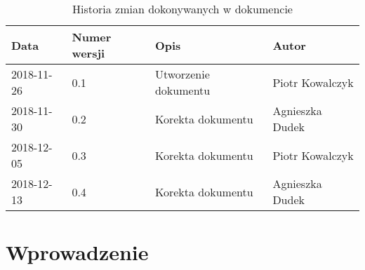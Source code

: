 \documentclass{article}
\begin{document}
\begin{titlepage}






\end{titlepage}

\addtocounter{page}{1}
\newpage

\begin{table}[h!]
	\begin{center}
		\caption{Historia zmian dokonywanych w dokumencie}
		\begin{tabular}{|l|l|l|l|}
			\hline
			Data & Numer wersji & Opis & Autor \\
			\hline \hline
			2018-11-26 & 0.1 & Utworzenie dokumentu & Piotr Kowalczyk \\
			\hline 
			2018-11-30 & 0.2 & Korekta dokumentu & Agnieszka Dudek \\
			\hline
			2018-12-05 & 0.3 & Korekta dokumentu & Piotr Kowalczyk \\
			\hline
			2018-12-13 & 0.4 & Korekta dokumentu & Agnieszka Dudek \\
			\hline
    \end{tabular}
	\end{center}
\end{table}	

\tableofcontents

\newpage


\section{Wprowadzenie}
\end{document}
